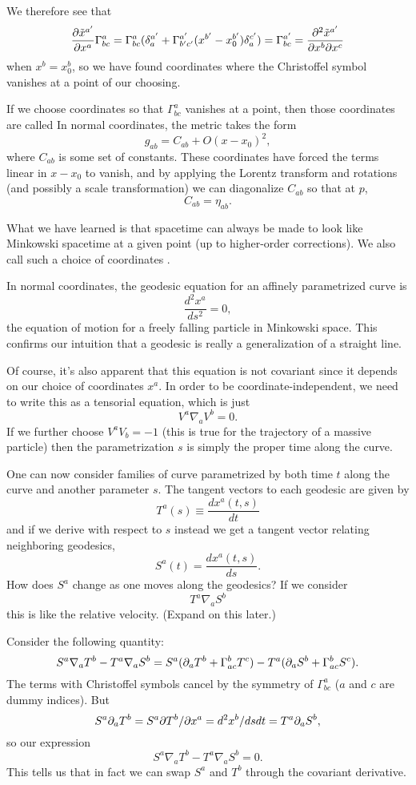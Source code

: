 We therefore see that
$$\frac{\partial \tilde x^{a'}}{\partial x^a} \Gamma^a_{bc}= \Gamma^a_{bc} (\delta^{a'}_a +\Gamma^{a'}_{b'c'}(x^{b'}-x^{b'}_0)\delta^{c'}_a)=\Gamma^{a'}_{bc}= \frac{\partial^2 \tilde x^{a'}}{\partial x^b \partial x^c}$$
when $x^b=x^b_0$, so we have found coordinates where the Christoffel symbol vanishes at a point of our choosing.

\begin{defn}
If we choose coordinates so that $\Gamma^a_{bc}$ vanishes at a point, then those coordinates are called  In normal coordinates, the metric takes the form
$$g_{ab}=C_{ab}+O(x-x_0)^2,$$
where $C_{ab}$ is some set of constants. These coordinates have forced the terms linear in $x-x_0$ to vanish, and by applying the Lorentz transform and rotations (and possibly a scale transformation) we can diagonalize $C_{ab}$ so that at $p$,
$$C_{ab}=\eta_{ab}.$$
\end{defn}
What we have learned is that spacetime can always be made to look like Minkowski spacetime at a given point (up to higher-order corrections). We also call such a choice of coordinates .

In normal coordinates, the geodesic equation for an affinely parametrized curve is
$$\frac{d^2x^a}{ds^2}=0,$$
the equation of motion for a freely falling particle in Minkowski space. This confirms our intuition that a geodesic is really a generalization of a straight line.

Of course, it's also apparent that this equation is not covariant since it depends on our choice of coordinates $x^a$. In order to be coordinate-independent, we need to write this as a tensorial equation, which is just
$$V^a\nabla_a V^b=0.$$ If we further choose $V^a V_b=-1$ (this is true for the trajectory of a massive particle) then the parametrization $s$ is simply the proper time along the curve.

One can now consider families of curve parametrized by both time $t$ along the curve and another parameter $s$. The tangent vectors to each geodesic are given by
$$T^a(s) \equiv \frac{dx^a(t,s)}{dt}$$
and if we derive with respect to $s$ instead we get a tangent vector relating neighboring geodesics,
$$S^a(t)=\frac{dx^a(t,s)}{ds}.$$
How does $S^a$ change as one moves along the geodesics? If we consider
$$T^a\nabla_a S^b$$ this is like the relative velocity. (Expand on this later.)

Consider the following quantity:
$$S^a \nabla_a T^b-T^a \nabla_a S^b = S^a (\partial_a T^b +\Gamma^b_{ac} T^c) - T^a (\partial_a S^b +\Gamma^b_{ac} S^c).$$
The terms with Christoffel symbols cancel by the symmetry of $\Gamma^a_{bc}$ ($a$ and $c$ are dummy indices). But $$S^a \partial_a T^b = S^a \partial T^b/\partial x^a = d^2 x^b/dsdt = T^a \partial_a S^b,$$
so our expression
$$S^a \nabla_a T^b-T^a \nabla_a S^b=0.$$
This tells us that in fact we can swap $S^a$ and $T^b$ through the covariant derivative.

